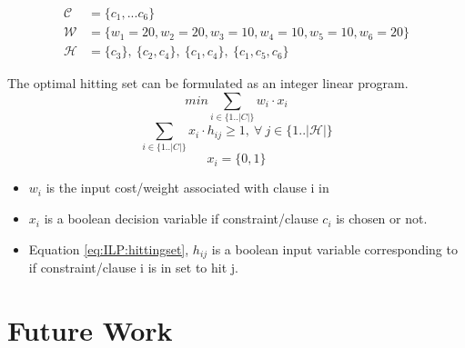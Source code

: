 \documentclass{article}
\newcommand\m[1]{\mathcal{#1}}
\begin{document}
\begin{equation} \label{mip:example}
  \begin{split}
    \m{C} &= \{c_1, ... c_6 \}  \\
    \m{W} &= \{w_1 = 20, w_2 = 20,  w_3 = 10,  w_4 = 10,  w_5 = 10,  w_6 = 20\} \\
    \m{H} &= \{c_3 \},\ \{c_2, c_4\},\ \{c_1, c_4\},\ \{c_1, c_5, c_6\} 
  \end{split}
  \end{equation}

The optimal hitting set can be formulated as an integer linear program.
\begin{equation} \label{eq:ILP:objective}
  min \sum_{ i \in \{1..|C|\}} w_i \cdot x_i
\end{equation}
\begin{equation} \label{eq:ILP:hittingset}
  \sum_{i \in \{1..|C|\}} x_i \cdot h_{ij} \geq 1, \  \forall \ j \in \{1..|\m{H}|\}
\end{equation}
\begin{equation} \label{eq:ILP:bool:xi}
  x_i = \{0,1\}
\end{equation}

\begin{itemize}
  \item $w_i$ is the input cost/weight associated with clause i in
  \item $x_i$ is a boolean decision variable if constraint/clause $c_i$ is chosen or not.
  \item Equation \ref{eq:ILP:hittingset}, $h_{ij}$ is a boolean input variable corresponding to if constraint/clause i is in set to hit j.
\end{itemize}

\newpage
\section{Future Work}

\newpage


\end{document}
